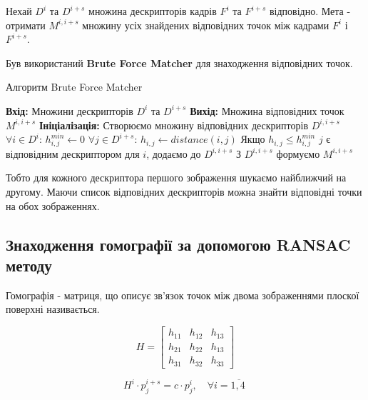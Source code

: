 Нехай $D^i$ та $D^{i+s}$ множина дескрипторів кадрів \(F^{i}\) та \(F^{i + s}\)
відповідно. Мета - отримати \(M^{i,i+s}\) множину усіх знайдених відповідних точок  між кадрами
\(F^{i}\) і \(F^{i + s}\).


Був використаний \textbf{Brute Force Matcher} для знаходження відповідних точок.
\begin{algorithm}[H]
    \caption{Алгоритм Brute Force Matcher}
    \begin{algorithmic}
        \State \textbf{Вхід:} Множини дескрипторів $D^i$ та $D^{i+s}$
        \State \textbf{Вихід:} Множина відповідних точок \(M^{i,i+s}\)
        \State \textbf{Ініціалізація:} Створюємо множину відповідних дескрипторів $D^{i,i+s}$
        \State $\forall i \in D^i$:
        \State  \qquad $h^{min}_{i,j} \gets 0$
        \State  \qquad  $\forall j \in D^{i+s}$:
        \State  \qquad \qquad  $h_{i,j} \gets distance(i,j)$
        \State  \qquad \qquad  Якщо {$h_{i,j} \leq h^{min}_{i,j}$}
        \State  \qquad \qquad  \qquad $j$ є відповідним  дескриптором для $i$, додаємо до  $D^{i,i+s}$
        \State З $D^{i,i+s}$ формуємо \(M^{i,i+s}\)
    \end{algorithmic}
    \label{al:brute-force-matcher}
\end{algorithm}

Тобто для кожного дескриптора першого зображення шукаємо найближчий на другому.
Маючи список відповідних дескрипторів можна знайти відповідні точки на обох зображеннях.

\subsection{Знаходження гомографії за допомогою RANSAC методу}

Гомографія - матриця, що описує зв'язок точок між двома зображеннями плоскої поверхні
називається.

\begin{equation}
    H =
    \begin{bmatrix}
        h_{11} & h_{12} & h_{13} \\
        h_{21} & h_{22} & h_{13} \\
        h_{31} & h_{32} & h_{33}
    \end{bmatrix}
    \label{eq:h_matrix}
\end{equation}

\begin{equation}
    H^{i} \cdot p_{j}^{i + s} = c \cdot p_{j}^{i},\quad\forall i = \overline{1,4\ }
    \label{eq:h_connection}
\end{equation}


